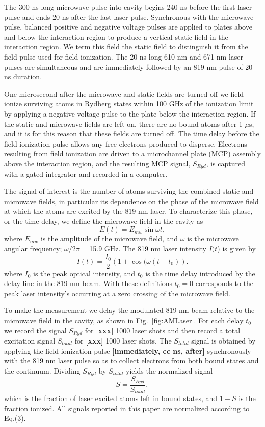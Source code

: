 \documentclass[aps,pra,preprint,groupedaddress]{revtex4-1}
\begin{document}
The 300 ns long microwave pulse into cavity begins 240 ns before the first laser pulse and ends 20 ns after the last laser pulse. Synchronous with the microwave pulse, balanced positive and negative voltage pulses are applied to plates above and below the interaction region to produce a vertical static field in the interaction region. We term this field the static field to distinguish it from the field pulse used for field ionization. The 20 ns long 610-nm and 671-nm laser pulses are simultaneous and are immediately followed by an 819 nm pulse of 20 ns duration.


One microsecond after the microwave and static fields are turned off we field ionize surviving atoms in Rydberg states within 100 GHz of the ionization limit by applying a negative voltage pulse to the plate below the interaction region. If the static and microwave fields are left on, there are no bound atoms after 1 $\mu$s, and it is for this reason that these fields are turned off. The time delay before the field ionization pulse allows any free electrons produced to disperse. Electrons resulting from field ionization are driven to a microchannel plate (MCP) assembly above the interaction region, and the resulting MCP signal, $S_{Ryd}$, is captured with a gated integrator and recorded in a computer.


The signal of interest is the number of atoms surviving the combined static and microwave fields, in particular its dependence on the phase of the microwave field at which the atoms are excited by the 819 nm laser.
To characterize this phase, or the time delay, we define the microwave field in the cavity as
\begin{equation}
E(t) =E_{mw}\sin{\omega t},
\end{equation}
where $E_{mw}$ is the amplitude of the microwave field, and $\omega$ is the microwave angular frequency; $\omega/2\pi=$15.9 GHz. The 819 nm laser intensity $I(t$) is given by
\begin{equation}
I(t) =\frac{I_0}{2}(1+\cos{(\omega (t-t_0)}).
\end{equation}
where $I_0$ is the peak optical intensity, and $t_0$ is the time delay introduced by the delay line in the 819 nm beam. With these definitions $t_0=0$ corresponds to the peak laser intensity's occurring at a zero crossing of the microwave field.


To make the measurement we delay the modulated 819 nm beam relative to the microwave field in the cavity, as shown in Fig.~\ref{fig:AMLaser}. For each delay $t_0$ we record the signal $S_{Ryd}$ for \textbf{[xxx]} 1000 laser shots and then record a total excitation signal $S_{total}$ for \textbf{[xxx]} 1000 laser shots. The $S_{total}$ signal is obtained by applying the field ionization pulse \textbf{[immediately, cc ns, after]} synchronously with the 819 nm laser pulse so as to collect electrons from both bound states and the continuum. Dividing $S_{Ryd}$ by $S_{total}$ yields the normalized signal
\begin{equation}
S=\frac{S_{Ryd}}{S_{total}},
\end{equation}
which is the fraction of laser excited atoms left in bound states, and $1-S$ is the fraction ionized. All signals reported in this paper are normalized according to Eq.(3).
\end{document}

